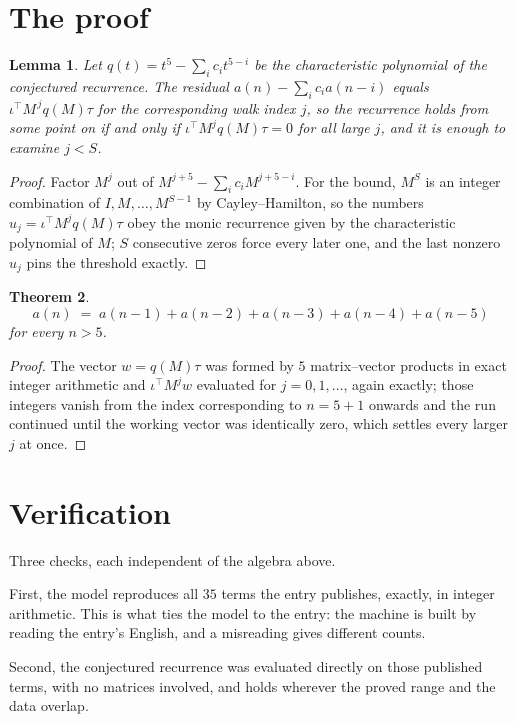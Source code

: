 \documentclass[11pt,a4paper]{article}
\theoremstyle{plain}
\newtheorem{theorem}{Theorem}
\newtheorem{lemma}[theorem]{Lemma}
\theoremstyle{definition}
\begin{document}
\section{The proof}

\begin{lemma}\label{lem:crit}
Let $q(t)=t^{5}-\sum_i c_it^{5-i}$ be the characteristic polynomial of the
conjectured recurrence. The residual $a(n)-\sum_ic_ia(n-i)$ equals
$\iota^{\!\top}M^{\,j}q(M)\tau$ for the corresponding walk index $j$, so the recurrence
holds from some point on if and only if $\iota^{\!\top}M^{j}q(M)\tau=0$ for all large $j$,
and it is enough to examine $j<S$.
\end{lemma}

\begin{proof}
Factor $M^{j}$ out of $M^{j+5}-\sum_ic_iM^{j+5-i}$. For the bound, $M^{S}$
is an integer combination of $I,M,\dots,M^{S-1}$ by Cayley--Hamilton, so the numbers
$u_j=\iota^{\!\top}M^{j}q(M)\tau$ obey the monic recurrence given by the characteristic
polynomial of $M$; $S$ consecutive zeros force every later one, and the last nonzero $u_j$
pins the threshold exactly.
\end{proof}

\begin{theorem}
\[
a(n)\;=\;a(n-1) + a(n-2) + a(n-3) + a(n-4) + a(n-5)
\]
for every $n>5$.
\end{theorem}

\begin{proof}
The vector $w=q(M)\tau$ was formed by $5$ matrix--vector products in exact integer
arithmetic and $\iota^{\!\top}M^{j}w$ evaluated for $j=0,1,\dots$, again exactly; those
integers vanish from the index corresponding to $n=5+1$ onwards and the run continued
until the working vector was identically zero, which settles every larger $j$ at once.
\end{proof}

\section{Verification}

Three checks, each independent of the algebra above.

First, the model reproduces all $35$ terms the entry publishes, exactly, in integer
arithmetic. This is what ties the model to the entry: the machine is built by reading the
entry's English, and a misreading gives different counts.

Second, the conjectured recurrence was evaluated directly on those published terms, with no
matrices involved, and holds wherever the proved range and the data overlap.
\end{document}
